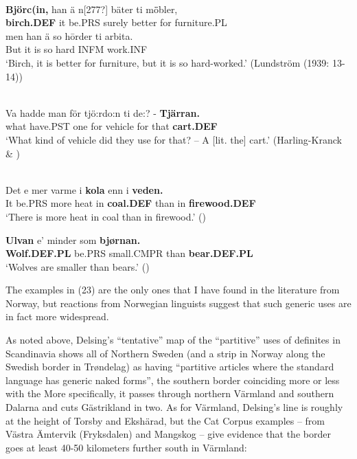 \z

\ea\label{}
\\
\gll	\textbf{Björc(in,} han  ä  n[277?]  bäter  ti  m\={ö}bler,\\
		\textbf{birch.DEF} it  be.PRS  surely  better  for  furniture.PL\\
\gll 	men  han  ä  so  h\=order  ti  arbita.\\
		But  it  is  so  hard  INFM   work.INF\\
\glt	‘Birch, it is better for furniture, but it is so hard-worked.’ (Lundström (1939: 13-14))

\z

\ea\label{}
\\
\gll	Va  hadde  man  för  tjö:rdo:n  ti  de:?  {}-  \textbf{Tjärran.}\\
		what  have.PST  one  for  vehicle  for  that    \textbf{cart.DEF}\\
\glt	‘What kind of vehicle did they use for that? – A [lit. the] cart.’ (Harling-Kranck \& \citet[42]{Mara1998})

\z

\ea\label{}
\label{bkm:Ref135628619}{}{}\\
	\ea
		\gll	Det  e  mer  varme  i  \textbf{kola} enn  i  \textbf{veden.}\\
				It  be.PRS  more  heat  in  \textbf{coal.DEF} than  in  \textbf{firewood.DEF}\\
		\glt	‘There is more heat in coal than in firewood.’ (\citet[19]{Iversen1918})

	\ex
		\gll	\textbf{Ulvan} e’  minder  som  \textbf{bjørnan.}\\
				\textbf{Wolf.DEF.PL} be.PRS  small.CMPR  than  \textbf{bear.DEF.PL}\\
				
		\glt	‘Wolves are smaller than bears.’ (\citet[18]{Iversen1918})
	\z 
\z

The examples in (23) are the only ones that I have found in the literature from Norway, but reactions from Norwegian linguists suggest that such generic uses are in fact more widespread. 


As noted above, Delsing’s “tentative” map of the “partitive” uses of definites in Scandinavia shows all of Northern Sweden (and a strip in Norway along the Swedish border in Trøndelag) as having “partitive articles where the standard language has generic naked forms”, the southern border coinciding more or less with the  More specifically, it passes through northern Värmland and southern Dalarna and cuts Gästrikland in two. As for Värmland, Delsing’s line is roughly at the height of Torsby and Ekshärad, but the Cat Corpus examples – from Västra Ämtervik (Fryksdalen) and Mangskog – give evidence that the border goes at least 40-50 kilometers further south in Värmland: 

